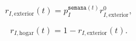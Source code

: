 \begin{equation}\label{eq:mov-5}
r_{I, \text{exterior}}(t) = p_I^{\mathtt{semana}(t)} r_{I,\text{exterior}}^0,
\end{equation}






\begin{equation}\label{eq:mov-6}
r_{I, \text{hogar}}(t) = 1 - r_{I,\text{exterior}}(t).
\end{equation}